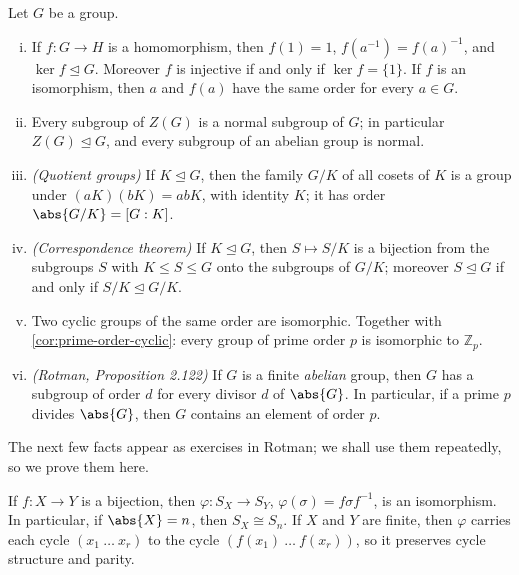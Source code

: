 \begin{proposition}\label{prop:hom-facts}
	Let \(G\) be a group.
	\begin{enumerate}[(i)]
		\item If \(f\colon G \to H\) is a homomorphism, then \(f(1) = 1\),
		      \(f(a^{-1}) = f(a)^{-1}\), and \(\ker f \trianglelefteq G\). Moreover \(f\) is
		      injective if and only if \(\ker f = \{1\}\). If \(f\) is an isomorphism, then
		      \(a\) and \(f(a)\) have the same order for every \(a \in G\).
		\item Every subgroup of \(Z(G)\) is a normal subgroup of \(G\); in particular
		      \(Z(G) \trianglelefteq G\), and every subgroup of an abelian group is normal.
		\item \emph{(Quotient groups)} If \(K \trianglelefteq G\), then the family \(G/K\)
		      of all cosets of \(K\) is a group under \((aK)(bK) = abK\), with identity
		      \(K\); it has order \(\abs{G/K} = [G:K]\).
		\item \emph{(Correspondence theorem)} If \(K \trianglelefteq G\), then
		      \(S \mapsto S/K\) is a bijection from the subgroups \(S\) with
		      \(K \leq S \leq G\) onto the subgroups of \(G/K\); moreover
		      \(S \trianglelefteq G\) if and only if \(S/K \trianglelefteq G/K\).
		\item Two cyclic groups of the same order are isomorphic. Together with
		      \autoref{cor:prime-order-cyclic}: every group of prime order \(p\) is
		      isomorphic to \(\mathbb Z_p\).
		\item \emph{(Rotman, Proposition 2.122)} If \(G\) is a finite \emph{abelian} group,
		      then \(G\) has a subgroup of order \(d\) for every divisor \(d\) of \(\abs{G}\).
		      In particular, if a prime \(p\) divides \(\abs{G}\), then \(G\) contains an
		      element of order \(p\).
	\end{enumerate}
\end{proposition}

The next few facts appear as exercises in Rotman; we shall use them repeatedly, so we
prove them here.

\begin{lemma}\label{lem:SX-iso}
	If \(f\colon X \to Y\) is a bijection, then
	\(\varphi\colon S_X \to S_Y\), \(\varphi(\sigma) = f\sigma f^{-1}\), is an isomorphism.
	In particular, if \(\abs{X} = n\), then \(S_X \cong S_n\). If \(X\) and \(Y\) are
	finite, then \(\varphi\) carries each cycle \((x_1\ \dots\ x_r)\) to the cycle
	\((f(x_1)\ \dots\ f(x_r))\), so it preserves cycle structure and parity.
\end{lemma}


